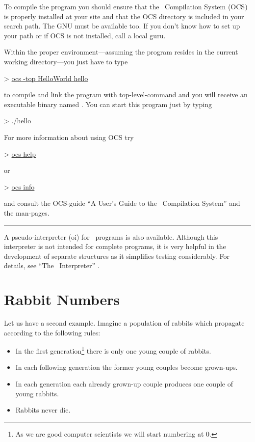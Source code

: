 {\small \novice 
  To compile the program you should ensure that the
\opal\ Compilation System (OCS) is properly installed at your site and
that the OCS 
directory  is included in your search path.
The GNU  must be available too.
If you don't know how to set up  your path or if OCS is not installed,
call a local guru. 


Within the proper environment---assuming the program 
resides in the current working directory---you just have to type 
\begin{prog}
  >  \underline{ocs -top HelloWorld hello}
\end{prog}
to compile and link the program  with
top-level-command  and you will receive an executable
binary named .
You can start this program just by typing 
\begin{prog}
  >  \underline{./hello}
\end{prog}

For more information about using OCS try 
\begin{prog}
  >  \underline{ocs help}
\end{prog}
or 
\begin{prog}
  >  \underline{ocs info}
\end{prog} 
and consult the OCS-guide ``A User's Guide to the \opal\  Compilation
System'' \cite{Ma} and the man-pages.
\newline\rule{5cm}{1pt}

\novice
 A pseudo-interpreter (oi) for \opal\ programs is also available.
Although this interpreter is not intended for complete programs, it is
very helpful in the development of separate structures as it simplifies
testing considerably. For details, see ``The \opal\ Interpreter'' \cite{Le}.
}



\section{Rabbit Numbers}
\novice
Let us have a second example. Imagine a population of rabbits which
propagate according to the following rules:
\begin{itemize}
\item In the first generation\footnote{As we are good computer scientists we
    will start numbering at 0.} there is only one young couple of
  rabbits.
\item In each following generation the former young couples become grown-ups.
\item In each generation each already grown-up couple produces one couple of
  young rabbits.
\item Rabbits never die.
\end{itemize}

